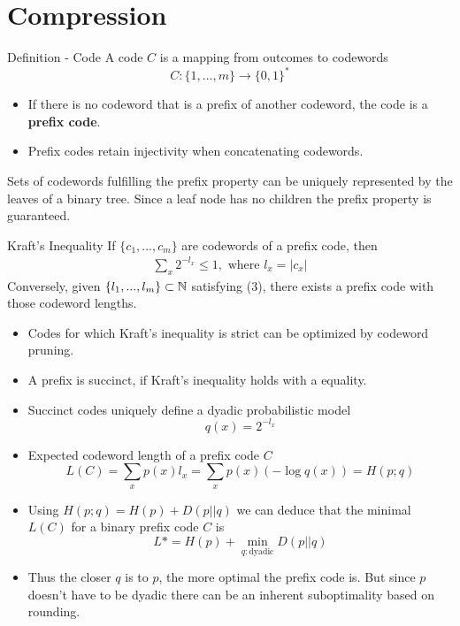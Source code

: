\section{Compression}

\begin{mainbox}
    {Definition - Code} 
    A code \(C\) is a mapping from outcomes to codewords
    \[C: \{1, ..., m\} \to \{0, 1\}^*\]
    \begin{itemize}[label=-]
        \item If there is no codeword that is a prefix of another codeword, the code is a \textbf{prefix code}. 
        \item Prefix codes retain injectivity when concatenating codewords.
    \end{itemize}
\end{mainbox}
Sets of codewords fulfilling the prefix property can be uniquely represented by the leaves of a binary tree. 
Since a leaf node has no children the prefix property is guaranteed.

\begin{mainbox}
    {Kraft's Inequality}
    If \(\{c_1, ...,c_m\}\) are codewords of a prefix code, then 
\begin{align}
    \sum_{x}2^{-l_x} \leq 1, \text{ where }l_x = |c_x|
\end{align}
Conversely, given \(\{l_1, ..., l_m\} \subset \mathbb{N}\) satisfying (3), there exists a prefix code with those codeword lengths.
\end{mainbox}
\begin{itemize}
    \item Codes for which Kraft's inequality is strict can be optimized by codeword pruning.
    \item A prefix is succinct, if Kraft's inequality holds with a equality.
    \item Succinct codes uniquely define a dyadic probabilistic model
    \[q(x) = 2^{- l_x}\]
    \item Expected codeword length of a prefix code \(C\) 
    \[L(C) = \sum_{x}p(x) l_x = \sum_{x}p(x) (-\log q(x)) = H(p; q)\]
    \item Using \(H(p; q) = H(p) + D(p || q)\) we can deduce that the minimal \(L(C)\) for a binary prefix code \(C\) is
    \[L* = H(p) + \min_{q: \text{dyadic}} D(p || q)\]
    \item Thus the closer \(q\) is to \(p\), the more optimal the prefix code is. 
    But since \(p\) doesn't have to be dyadic there can be an inherent suboptimality based on rounding.
\end{itemize}

